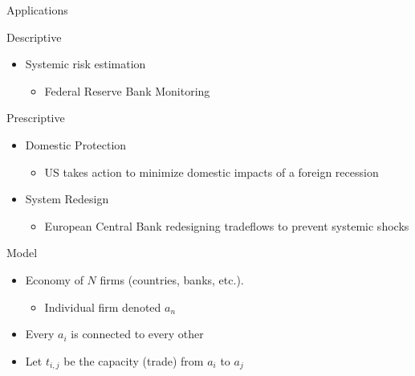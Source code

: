 \documentclass[
  ignorenonframetext,
]{beamer}
\providecommand{\tightlist}{%
  \setlength{\itemsep}{0pt}\setlength{\parskip}{0pt}}
\begin{document}
\begin{frame}{Applications}
\protect\hypertarget{applications}{}

\begin{block}{Descriptive}

\begin{itemize}
\tightlist
\item
  Systemic risk estimation

  \begin{itemize}
  \tightlist
  \item
    Federal Reserve Bank Monitoring
  \end{itemize}
\end{itemize}

\end{block}

\begin{block}{Prescriptive}

\begin{itemize}
\tightlist
\item
  Domestic Protection

  \begin{itemize}
  \tightlist
  \item
    US takes action to minimize domestic impacts of a foreign recession
  \end{itemize}
\item
  System Redesign

  \begin{itemize}
  \tightlist
  \item
    European Central Bank redesigning tradeflows to prevent systemic
    shocks
  \end{itemize}
\end{itemize}

\end{block}

\end{frame}

\begin{frame}{Model}
\protect\hypertarget{model}{}

\begin{itemize}
\tightlist
\item
  Economy of \(N\) firms (countries, banks, etc.).

  \begin{itemize}
  \tightlist
  \item
    Individual firm denoted \(a_n\)
  \end{itemize}
\item
  Every \(a_i\) is connected to every other
\item
  Let \(t_{i,j}\) be the capacity (trade) from \(a_i\) to \(a_j\)
\end{itemize}

\end{frame}
\end{document}
